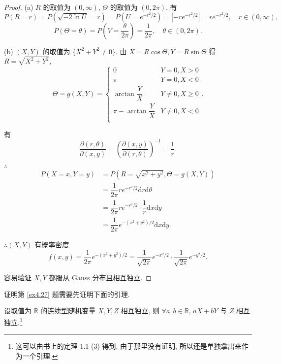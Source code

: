 \documentclass[color=black,device=normal,lang=cn]{elegantnote}
\numberwithin{equation}{section}
\theoremstyle{plain}
\numberwithin{exercise}{exsection}
\begin{document}
\begin{proof}
    (a) $R$ 的取值为 $(0,\infty)$, $\Theta$ 的取值为 $(0,2\pi)$. 有
    \[P(R=r)=P(\sqrt{-2\ln U}=r)=P(U=e^{-r^2/2})=|-re^{-r^2/2}|=re^{-r^2/2},\quad r\in(0,\infty),\]
    \[P(\Theta=\theta)=P\left(V=\dfrac{\theta}{2\pi}\right)=\dfrac{1}{2\pi},\quad\theta\in(0,2\pi).\]

    (b) $(X,Y)$ 的取值为 $\{X^2+Y^2\neq0\}$. 由 $X=R\cos\Theta,Y=R\sin\Theta$ 得 $R=\sqrt{X^2+Y^2}$,
    \[\Theta=g(X,Y)=\begin{cases}
        0 & Y=0,X>0 \\
        \pi & Y=0,X<0 \\
        \arctan\dfrac{Y}{X} & Y\neq0,X\geq0 \\
        \pi-\arctan\dfrac{Y}{X} & Y\neq0,X<0 \\
    \end{cases}.\]

    有
    \[\dfrac{\partial(r,\theta)}{\partial(x,y)}=\left(\dfrac{\partial(x,y)}{\partial(r,\theta)}\right)^{-1}=\dfrac{1}{r}.\]

    $\therefore$
    \begin{align*}
        P(X=x,Y=y) & =P(R=\sqrt{x^2+y^2},\Theta=g(X,Y)) \\
        & =\dfrac{1}{2\pi}re^{-r^2/2}\mathrm{d}r\mathrm{d}\theta \\
        & =\dfrac{1}{2\pi}re^{-r^2/2}\cdot\dfrac{1}{r}\mathrm{d}x\mathrm{d}y \\
        & =\dfrac{1}{2\pi}e^{-(x^2+y^2)/2}\mathrm{d}x\mathrm{d}y.
    \end{align*}

    $\therefore(X,Y)$ 有概率密度
    \[f(x,y)=\dfrac{1}{2\pi}e^{-(x^2+y^2)/2}=\dfrac{1}{\sqrt{2\pi}}e^{-x^2/2}\cdot\dfrac{1}{\sqrt{2\pi}}e^{-y^2/2}.\]

    容易验证 $X,Y$ 都服从 Gauss 分布且相互独立.
\end{proof}
证明第 \ref{ex4.27} 题需要先证明下面的引理.
\begin{lemma}\label{l8.1}
    设取值为 $\mathbb{R}$ 的连续型随机变量 $X,Y,Z$ 相互独立, 则 $\forall a,b\in\mathbb{R}$, $aX+bY$ 与 $Z$ 相互独立.\footnote{这可以由书上的定理 1.1 (3) 得到, 由于那里没有证明, 所以还是单独拿出来作为一个引理.}
\end{lemma}
\end{document}
